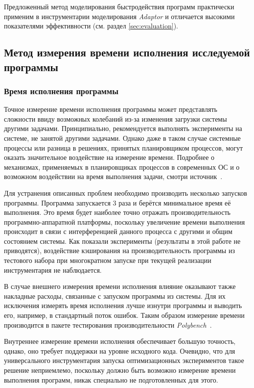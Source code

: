 Предложенный метод моделирования быстродействия программ практически применим в инструментарии моделирования \textit{Adaptor} и отличается высокими показателями эффективности (см. раздел \ref{sec:evaluation}).

\subsection{Метод измерения времени исполнения исследуемой программы}
\subsubsection{Время исполнения программы}
Точное измерение времени исполнения программы может представлять сложности ввиду возможных колебаний из-за изменения загрузки системы другими задачами. Принципиально, рекомендуется выполнять эксперименты на системе, не занятой другими задачами. Однако даже в таком случае системные процессы или разница в решениях, принятых планировщиком процессов, могут оказать значительное воздействие на измерение времени. Подробнее о механизмах, применяемых в планировщиках процессов в современных ОС и о возможном воздействии на время выполнения задачи, смотри источник~\cite{scheduling}.

Для устранения описанных проблем необходимо производить несколько запусков программы. Программа запускается 3 раза и берётся минимальное время её выполнения. Это время будет наиболее точно отражать производительность программно-аппаратной платформы, поскольку увеличение времени выполнения происходит в связи с интерференцией данного процесса с другими и общим состоянием системы. Как показали эксперименты (результаты в этой работе не приводятся), воздействие кэширования на производительность программы из тестового набора при многократном запуске при текущей реализации инструментария не наблюдается.

В случае внешнего измерения времени исполнения влияние оказывают также накладные расходы, связанные с запуском программы из системы. Для их исключения измерять время исполнения лучше изнутри программы и выводить его, например, в стандартный поток ошибок. Таким образом измерение времени производится в пакете тестирования производительности \textit{Polybench}~\cite{polybench}.

Внутреннее измерение времени исполнения обеспечивает большую точность, однако, оно требует поддержки на уровне исходного кода. Очевидно, что для универсального инструментария запуска оптимизационных экспериментов такое решение неприемлемо, поскольку должно быть возможно измерение времени выполнения программ, никак специально не подготовленных для этого.


